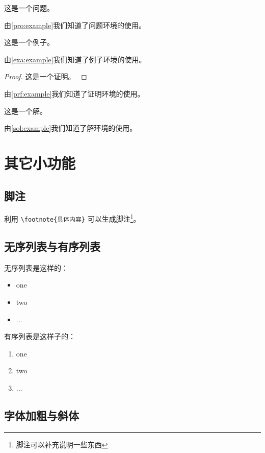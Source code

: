 \begin{problem}
    这是一个问题。
    \label{pro:example}
\end{problem}
由\cref{pro:example}我们知道了问题环境的使用。

\begin{example}
    这是一个例子。
    \label{exa:example}
\end{example}
由\cref{exa:example}我们知道了例子环境的使用。

\begin{proof}
    这是一个证明。
    \label{prf:example}
\end{proof}
由\cref{prf:example}我们知道了证明环境的使用。

\begin{solution}
    这是一个解。
    \label{sol:example}
\end{solution}
由\cref{sol:example}我们知道了解环境的使用。

\section{其它小功能}
\subsection{脚注}

利用 \verb|\footnote{具体内容}| 可以生成脚注\footnote{脚注可以补充说明一些东西}。

\subsection{无序列表与有序列表}

无序列表是这样的：
\begin{itemize}
    \item one
    \item two
    \item ...
\end{itemize}

有序列表是这样子的：
\begin{enumerate}
    \item one
    \item two
    \item ...
\end{enumerate}

\subsection{字体加粗与斜体}

